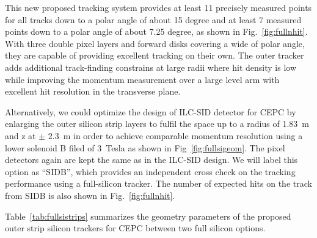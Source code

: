 This new proposed tracking system provides at least 11 precisely measured points for all tracks down to a polar angle of about 15 degree and 
at least 7 measured points down to a polar angle of about 7.25 degree, as shown in Fig.~\ref{fig:fullnhit}. With three double pixel layers 
and forward disks covering a wide of polar angle, they are capable of providing excellent tracking on their own. 
The outer tracker adds additional track-finding constrains at large radii where hit density is low while improving the momentum 
measurement over a large level arm with excellent hit resolution in the transverse plane.

Alternatively, we could optimize the design of ILC-SID detector for CEPC by enlarging the outer silicon strip layers
to fulfil the space up to a radius of 1.83~m and z at $\pm$ 2.3~m in order to achieve comparable momentum resolution using
a lower solenoid B filed of 3~Tesla as shown in Fig~\ref{fig:fullsigeom}. The pixel detectors again are kept the same 
as in the ILC-SID design.  We will label this option as ``SIDB'', which provides an independent cross check on the tracking performance
using a full-silicon tracker. The number of expected hits on the track from SIDB is also shown in Fig.~\ref{fig:fullnhit}.  

Table~\ref{tab:fullsistrips} summarizes the geometry parameters of the proposed outer strip silicon trackers for CEPC between two full silicon 
options.

